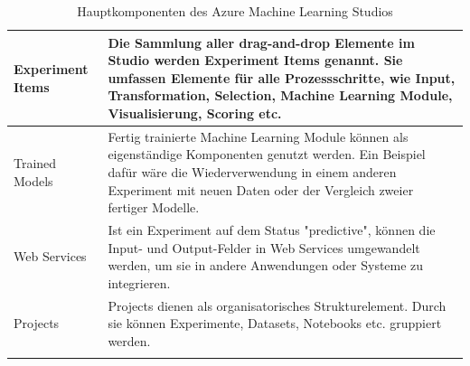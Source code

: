 \begin{longtable}[H]{|p{}|p{14cm}|}
\hline
Experiment Items & Die Sammlung aller drag-and-drop Elemente im Studio werden Experiment Items genannt. Sie umfassen Elemente für alle Prozessschritte, wie Input, Transformation, Selection, Machine Learning Module, Visualisierung, Scoring etc.\\
\hline
Trained Models & Fertig trainierte Machine Learning Module können als eigenständige Komponenten genutzt werden. Ein Beispiel dafür wäre die Wiederverwendung in einem anderen Experiment mit neuen Daten oder der Vergleich zweier fertiger Modelle.\\
\hline
Web Services & Ist ein Experiment auf dem Status "predictive", können die Input- und Output-Felder in Web Services umgewandelt werden, um sie in andere Anwendungen oder Systeme zu integrieren.\\
\hline
Projects & Projects dienen als organisatorisches Strukturelement. Durch sie können Experimente, Datasets, Notebooks etc. gruppiert werden. \\
\hline
\caption{Hauptkomponenten des Azure Machine Learning Studios}
\label{tab:azuremlcomponents}
\end{longtable}

